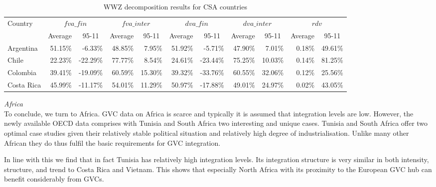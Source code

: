\documentclass[11pt,a4paper]{article}
\begin{document}
\begin{table}[htbp]\small
  \centering
  \caption{WWZ decomposition results for CSA countries}
  \hspace*{-2.7cm}
    \begin{tabular}{lrrrrrrrrrr} 
    \toprule
    \multicolumn{1}{l}{\multirow{1}[0]{*}{Country}} & \multicolumn{2}{c}{$fva\_fin$} & \multicolumn{2}{c}{$fva\_inter$} & \multicolumn{2}{c}{$dva\_fin$} & \multicolumn{2}{c}{$dva\_inter$} & \multicolumn{2}{c}{$rdv$} \\
    \multicolumn{1}{l}{} & \multicolumn{1}{c}{Average} & \multicolumn{1}{c}{95-11} &
\multicolumn{1}{c}{Average} & \multicolumn{1}{c}{95-11} & \multicolumn{1}{c}{Average} & \multicolumn{1}{c}{95-11} & \multicolumn{1}{c}{Average} & \multicolumn{1}{c}{95-11} & \multicolumn{1}{c}{Average} & \multicolumn{1}{c}{95-11} \\
  \midrule
    Argentina & 51.15\% & -6.33\% & 48.85\% & 7.95\% & 51.92\% & -5.71\% & 47.90\% & 7.01\% & 0.18\% & 49.61\% \\
    Chile & 22.23\% & -22.29\% & 77.77\% & 8.54\% & 24.61\% & -23.44\% & 75.25\% & 10.03\% & 0.14\% & 81.25\% \\
    Colombia & 39.41\% & -19.09\% & 60.59\% & 15.30\% & 39.32\% & -33.76\% & 60.55\% & 32.06\% & 0.12\% & 25.56\% \\
    Costa Rica & 45.99\% & -11.17\% & 54.01\% & 11.29\% & 50.97\% & -17.88\% & 49.01\% & 24.97\% & 0.02\% & 43.05\% \\
   \bottomrule
    \end{tabular}
  \label{tab:csawwz}
\end{table}

\textit{Africa}\\
To conclude, we turn to Africa. GVC data on Africa is scarce and typically it is assumed that integration levels are low. However, the newly available OECD data comprises with Tunisia and South Africa two interesting and unique cases. Tunisia and South Africa offer two optimal case studies given their relatively stable political situation and relatively high degree of industrialisation. Unlike many other African they do thus fulfil the basic requirements for GVC integration.

In line with this we find that in fact Tunisia has relatively high integration levels. Its integration structure is very similar in both intensity, structure, and trend to Costa Rica and Vietnam. This shows that especially North Africa with its proximity to the European GVC hub can benefit considerably from GVCs.
\end{document}
